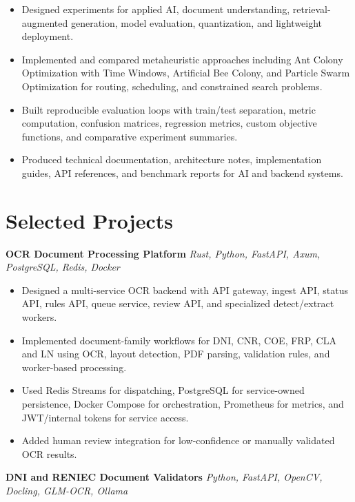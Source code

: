 \documentclass[10pt,letterpaper]{article}
\newcommand{\resumeProjectHeading}[2]{
  \textbf{#1} \hfill \textit{#2}
}
\begin{document}
\begin{itemize}
    \item Designed experiments for applied AI, document understanding, retrieval-augmented generation, model evaluation, quantization, and lightweight deployment.
    \item Implemented and compared metaheuristic approaches including Ant Colony Optimization with Time Windows, Artificial Bee Colony, and Particle Swarm Optimization for routing, scheduling, and constrained search problems.
    \item Built reproducible evaluation loops with train/test separation, metric computation, confusion matrices, regression metrics, custom objective functions, and comparative experiment summaries.
    \item Produced technical documentation, architecture notes, implementation guides, API references, and benchmark reports for AI and backend systems.
\end{itemize}


\section{Selected Projects}

\resumeProjectHeading
{OCR Document Processing Platform}{Rust, Python, FastAPI, Axum, PostgreSQL, Redis, Docker}

\begin{itemize}
    \item Designed a multi-service OCR backend with API gateway, ingest API, status API, rules API, queue service, review API, and specialized detect/extract workers.
    \item Implemented document-family workflows for DNI, CNR, COE, FRP, CLA and LN using OCR, layout detection, PDF parsing, validation rules, and worker-based processing.
    \item Used Redis Streams for dispatching, PostgreSQL for service-owned persistence, Docker Compose for orchestration, Prometheus for metrics, and JWT/internal tokens for service access.
    \item Added human review integration for low-confidence or manually validated OCR results.
\end{itemize}

\resumeProjectHeading
{DNI and RENIEC Document Validators}{Python, FastAPI, OpenCV, Docling, GLM-OCR, Ollama}
\end{document}

